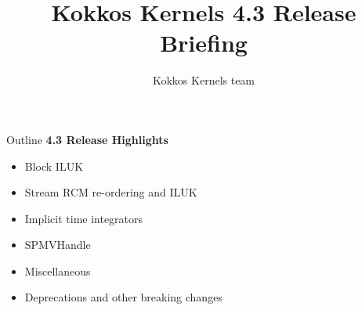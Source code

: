 
\usepackage{tikz}
\graphicspath{{kk_4_3/figures/}}

\title{Kokkos Kernels 4.3 Release Briefing}

\author{Kokkos Kernels team}




\shorttrue
\mediumfalse
\fullfalse



\begin{frame}
        \titlepage
\end{frame}



\begin{frame}[fragile]{Outline}
\textbf{4.3 Release Highlights}
    \begin{itemize}
      \item{Block ILUK}
      \item{Stream RCM re-ordering and ILUK}
      \item{Implicit time integrators}
      \item{SPMVHandle}
      \item{Miscellaneous}
      \item{Deprecations and other breaking changes}
    \end{itemize}
\end{frame}



